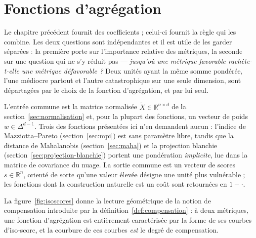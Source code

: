 \documentclass[11pt,a4paper]{article}
\theoremstyle{definition}
\theoremstyle{remark}
\newcommand{\R}{\mathbb{R}}
\newcommand{\simplex}{\Delta^{d-1}}
\begin{document}
\section{Fonctions d'agrégation}
\label{sec:agregation}

\medskip

Le chapitre précédent fournit des coefficients ; celui-ci fournit la règle qui les
combine. Les deux questions sont indépendantes et il est utile de les garder séparées :
la première porte sur l'importance relative des métriques, la seconde sur une question
qui ne s'y réduit pas --- \emph{jusqu'où une métrique favorable rachète-t-elle une
métrique défavorable ?} Deux unités ayant la même somme pondérée, l'une médiocre partout
et l'autre catastrophique sur une seule dimension, sont départagées par le choix de la
fonction d'agrégation, et par lui seul.

\bigskip

L'entrée commune est la matrice normalisée $\tilde{X} \in \R^{n \times d}$ de la
section~\ref{sec:normalisation} et, pour la plupart des fonctions, un vecteur de poids
$w \in \simplex$. Trois des fonctions présentées ici n'en demandent aucun : l'indice de
Mazziotta--Pareto (section~\ref{sec:mpi}) est sans paramètre libre, tandis que la distance
de Mahalanobis (section~\ref{sec:maha}) et la projection blanchie
(section~\ref{sec:projection-blanchie}) portent une pondération \emph{implicite}, lue dans
la matrice de covariance du nuage. La sortie commune est un vecteur de scores
$s \in \R^n$, orienté de sorte qu'une valeur élevée désigne une unité plus vulnérable ; les
fonctions dont la construction naturelle est un coût sont retournées en $1 - \cdot$.

\bigskip

La figure~\ref{fig:isoscores} donne la lecture géométrique de la notion de compensation
introduite par la définition~\ref{def:compensation} : à deux métriques, une fonction
d'agrégation est entièrement caractérisée par la forme de ses courbes d'iso-score, et la
courbure de ces courbes \emph{est} le degré de compensation.

\medskip
\end{document}
